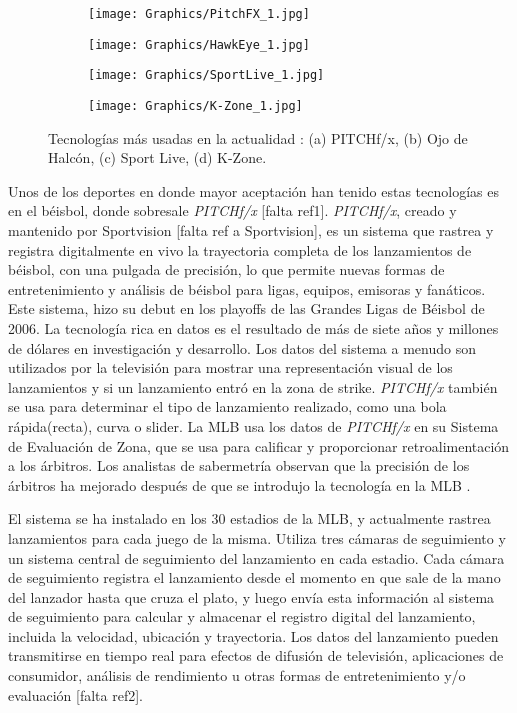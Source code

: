 \begin{figure}[!h]
	\centering
	\begin{subfigure}[b]{0.49\linewidth}
		\texttt{[image: Graphics/PitchFX\_1.jpg]}
		\caption{}
	\end{subfigure}
	\begin{subfigure}[b]{0.49\linewidth}
		\texttt{[image: Graphics/HawkEye\_1.jpg]}
		\caption{}
	\end{subfigure}
    \begin{subfigure}[b]{0.49\linewidth}
        \texttt{[image: Graphics/SportLive\_1.jpg]}
        \caption{}
    \end{subfigure}
    \begin{subfigure}[b]{0.49\linewidth}
        \texttt{[image: Graphics/K-Zone\_1.jpg]}
        \caption{}
    \end{subfigure}
    \caption{Tecnologías más usadas en la actualidad : (a) PITCHf/x, (b) Ojo de Halcón,
            (c) Sport Live, (d) K-Zone.}
	\label{fig:technologys}
\end{figure}

Unos de los deportes en donde mayor aceptación han tenido estas tecnologías es en el béisbol, donde sobresale \textit{PITCHf/x} [falta ref1]. \textit{PITCHf/x}, creado y mantenido por Sportvision [falta ref a Sportvision], es un sistema que rastrea y registra digitalmente en vivo la trayectoria completa de los lanzamientos de béisbol, con una pulgada de precisión, lo que permite nuevas formas de entretenimiento y análisis de béisbol para ligas, equipos, emisoras y fanáticos. Este sistema, hizo su debut en los playoffs de las Grandes Ligas de Béisbol \cite[MLB]{MLB} de 2006. La tecnología rica en datos es el resultado de más de siete años y millones de dólares en investigación y desarrollo. Los datos del sistema a menudo son utilizados por la televisión para mostrar una representación visual de los lanzamientos y si un lanzamiento entró en la zona de strike. \textit{PITCHf/x} también se usa para determinar el tipo de lanzamiento realizado, como una bola rápida(recta), curva o slider. La MLB usa los datos de \textit{PITCHf/x} en su Sistema de Evaluación de Zona, que se usa para calificar y proporcionar retroalimentación a los árbitros. Los analistas de sabermetría observan que la precisión de los árbitros ha mejorado después de que se introdujo la tecnología en la MLB \cite{SlateSportArticles}.

El sistema se ha instalado en los 30 estadios de la MLB, y actualmente rastrea lanzamientos para cada juego de la misma. Utiliza tres cámaras de seguimiento y un sistema central de seguimiento del lanzamiento en cada estadio. Cada cámara de seguimiento registra el lanzamiento desde el momento en que sale de la mano del lanzador hasta que cruza el plato, y luego envía esta información al sistema de seguimiento para calcular y almacenar el registro digital del lanzamiento, incluida la velocidad, ubicación y trayectoria. Los datos del lanzamiento pueden transmitirse en tiempo real para efectos de difusión de televisión, aplicaciones de consumidor, análisis de rendimiento u otras formas de entretenimiento y/o evaluación [falta ref2].

